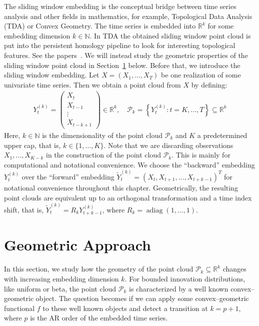The sliding window embedding is the conceptual bridge between time series analysis and other fields in mathematics, for example, Topological Data Analysis (TDA) or Convex Geometry. The time series is embedded into $\mathbb{R}^k$ for some embedding dimension $k\in\mathbb{N}$. In TDA the obtained sliding window point cloud is put into the persistent homology pipeline to look for interesting topological features. See the papers~\cite{perea_sliding_2015}. We will instead study the geometric properties of the sliding window point cloud in Section~\ref{sec:geometric_approach} below. Before that, we introduce the sliding window embedding. Let $X=(X_1,\dots,X_T)$ be one realization of some univariate time series. Then we obtain a point cloud from $X$ by defining:
\begin{align*}
    Y_t^{(k)}=\begin{pmatrix}
        X_{t}\\
        X_{t-1}\\
        \vdots\\
        X_{t-k+1}
    \end{pmatrix}\in\mathbb{R}^k,\quad\mathcal{P}_{k}=\left\{Y_t^{(k)}:t=K,\dots,T\right\}\subseteq\mathbb{R}^k
\end{align*}
Here, $k\in\mathbb{N}$ is the dimensionality of the point cloud $\mathcal{P}_{k}$ and $K$ a predetermined upper cap, that is, $k\in\{1,\dots,K\}$. Note that we are discarding observations $X_1,\dots,X_{K-k}$ in the construction of the point cloud $\mathcal{P}_k$. This is mainly for computational and notational convenience. We choose the \enquote{backward} embedding $Y_t^{(k)}$ over the \enquote{forward} embedding $\tilde{Y}_t^{(k)}=(X_t,X_{t+1},\dots,X_{t+k-1})^{T}$ for notational convenience throughout this chapter. Geometrically, the resulting point clouds are equivalent up to an orthogonal transformation and a time index shift, that is, $\tilde{Y}_t^{(k)}=R_kY_{t+k-1}^{(k)}$, where $R_k=\operatorname{adiag}(1,\dots,1)$.

\section{Geometric Approach}\label{sec:geometric_approach}

In this section, we study how the geometry of the point cloud $\mathcal{P}_k\subseteq\mathbb{R}^{k}$ changes with increasing embedding dimension $k$. For bounded innovation distributions, like uniform or beta, the point cloud $\mathcal{P}_k$ is characterized by a well known convex--geometric object. The question becomes if we can apply some convex--geometric functional $f$ to these well known objects and detect a transition at $k=p+1$, where $p$ is the AR order of the embedded time series.

